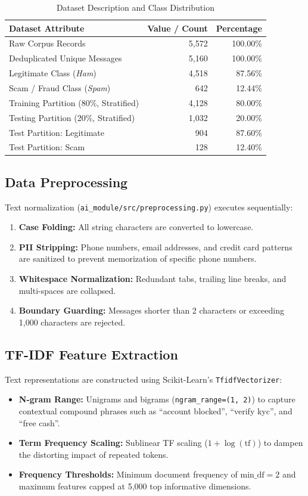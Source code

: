 \documentclass[conference]{IEEEtran}
\providecommand{\toprule}{\hline\hline}
\providecommand{\midrule}{\hline}
\providecommand{\bottomrule}{\hline\hline}
\begin{document}
\begin{table}[h]
\caption{Dataset Description and Class Distribution}
\label{tab:dataset}
\centering
\small
\begin{tabular}{lrr}
\toprule
\textbf{Dataset Attribute} & \textbf{Value / Count} & \textbf{Percentage} \\
\midrule
Raw Corpus Records & 5,572 & 100.00\% \\
Deduplicated Unique Messages & 5,160 & 100.00\% \\
Legitimate Class (\textit{Ham}) & 4,518 & 87.56\% \\
Scam / Fraud Class (\textit{Spam}) & 642 & 12.44\% \\
Training Partition (80\%, Stratified) & 4,128 & 80.00\% \\
Testing Partition (20\%, Stratified) & 1,032 & 20.00\% \\
Test Partition: Legitimate & 904 & 87.60\% \\
Test Partition: Scam & 128 & 12.40\% \\
\bottomrule
\end{tabular}
\end{table}

\subsection{Data Preprocessing}
Text normalization (\texttt{ai\_module/src/preprocessing.py}) executes sequentially:
\begin{enumerate}
    \item \textbf{Case Folding:} All string characters are converted to lowercase.
    \item \textbf{PII Stripping:} Phone numbers, email addresses, and credit card patterns are sanitized to prevent memorization of specific phone numbers.
    \item \textbf{Whitespace Normalization:} Redundant tabs, trailing line breaks, and multi-spaces are collapsed.
    \item \textbf{Boundary Guarding:} Messages shorter than 2 characters or exceeding 1,000 characters are rejected.
\end{enumerate}

\subsection{TF-IDF Feature Extraction}
Text representations are constructed using Scikit-Learn's \texttt{TfidfVectorizer}:
\begin{itemize}
    \item \textbf{N-gram Range:} Unigrams and bigrams (\texttt{ngram\_range=(1, 2)}) to capture contextual compound phrases such as ``account blocked'', ``verify kyc'', and ``free cash''.
    \item \textbf{Term Frequency Scaling:} Sublinear TF scaling ($1 + \log(\text{tf})$) to dampen the distorting impact of repeated tokens.
    \item \textbf{Frequency Thresholds:} Minimum document frequency of $\text{min\_df} = 2$ and maximum features capped at 5,000 top informative dimensions.
\end{itemize}
\end{document}
